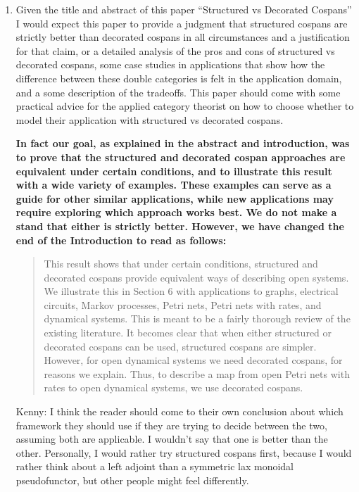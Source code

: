 \documentclass[reqno]{amsart}
\def\kenny{\color{blue} Kenny: }
\begin{document}
\begin{enumerate}

\item Given the title and abstract of this paper “Structured vs Decorated Cospans” I would expect this paper to provide a judgment that structured  cospans are strictly better than decorated cospans in all circumstances and a justification for that claim, or a detailed analysis of the pros and cons of 
structured vs decorated cospans, some case studies in applications that show how the difference between these double categories is felt in the 
application domain, and a some description of the tradeoffs. This paper should come with some practical advice for the applied category theorist on 
how to choose whether to model their application with structured vs decorated cospans. 

{\bf In fact our goal, as explained in the abstract and introduction, was to prove that the structured and decorated cospan approaches are equivalent under certain conditions, and to illustrate this result with a wide variety of examples.  These examples can serve as a guide for other similar applications, while new applications may require exploring which approach works best.  We do not make a stand that either is strictly better.   However, we have changed the end of the Introduction to read as follows:

\begin{quote}
This result shows that under certain conditions, structured and decorated cospans provide equivalent ways of describing open systems.  We illustrate this in Section 6 with applications to graphs, electrical circuits, Markov processes, Petri nets, Petri nets with rates, and dynamical systems.   This is meant to be a fairly thorough review of the existing literature.   It becomes clear that when either structured or decorated cospans can be used, structured cospans are simpler.  However, for open dynamical systems we need decorated cospans, for reasons we explain.   Thus, to describe a map from open Petri nets with rates to open dynamical systems, we use decorated cospans.
\end{quote}
}

  
\iffalse
{\kenny I think the reader should come to their own conclusion about which framework they should use if they are trying to decide between the two, assuming both are applicable. I wouldn't say that one is better than the other. Personally, I would rather try structured cospans first, because I would rather think about a left adjoint than a symmetric lax monoidal pseudofunctor, but other people might feel differently.} 


\end{enumerate}
\end{document}

